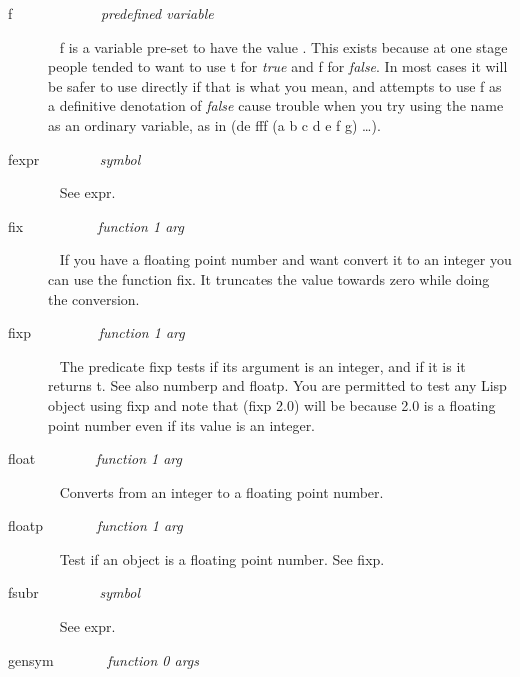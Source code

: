 \begin{description}
\item[{\tx f~~~~~~~~~~~~} \hspace{1cm} {\em predefined variable}]~\newline
{\tx f} is a variable pre-set to have the value \nil. This exists because at
one stage people tended to want to use {\tx t} for {\em true} and {\tx f}
for {\em false}. In most cases it will be safer to use \nil{} directly if that
is what you mean, and attempts to use {\tx f} as a definitive denotation
of {\em false} cause trouble when you try using the name as an ordinary variable,
as in {\tx (de fff (a b c d e f g) \ldots)}.
\item[{\tx fexpr~~~~~~~~} \hspace{1cm} {\em symbol}]~\newline
See {\tx expr}.
\item[{\tx fix~~~~~~~~~~} \hspace{1cm} {\em function 1 arg}]~\newline
If you have a floating point number and want convert it to an integer you can
use the function {\tx fix}. It truncates the value towards zero while
doing the conversion.
\item[{\tx fixp~~~~~~~~~} \hspace{1cm} {\em function 1 arg}]~\newline
The predicate {\tx fixp} tests if its argument is an integer, and if it is
it returns {\tx t}. See also {\tx numberp} and {\tx floatp}. You are
permitted to test any Lisp object using {\tx fixp} and note that
{\tx (fixp 2.0)} will be \nil{} because 2.0 is a floating point number even
if its value is an integer.
\item[{\tx float~~~~~~~~} \hspace{1cm} {\em function 1 arg}]~\newline
Converts from an integer to a floating point number.
\item[{\tx floatp~~~~~~~} \hspace{1cm} {\em function 1 arg}]~\newline
Test if an object is a floating point number. See {\tx fixp}.
\item[{\tx fsubr~~~~~~~~} \hspace{1cm} {\em symbol}]~\newline
See {\tx expr}.
\item[{\tx gensym~~~~~~~} \hspace{1cm} {\em function 0 args}]~\newline

\end{description}
